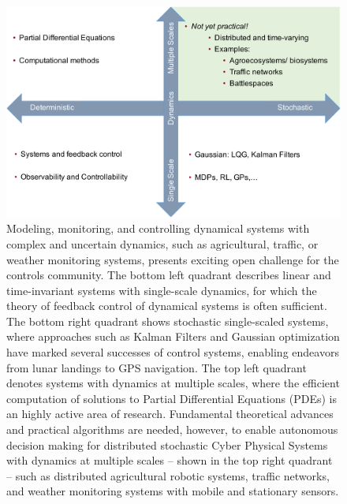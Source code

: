 \documentclass[letterpaper,12pt,peerreviewca,draftcls]{IEEEtran}
\begin{document}
\begin{figure}[h] %
	\centering
	\includegraphics[width=\columnwidth]{"Figure 2"}
		\caption{Modeling, monitoring, and controlling dynamical systems with complex and uncertain dynamics, such as agricultural, traffic, or weather monitoring systems, presents exciting open challenge for the controls community. The bottom left quadrant describes linear and time-invariant systems with single-scale dynamics, for which the theory of feedback control of dynamical systems is often sufficient. The bottom right quadrant shows stochastic single-scaled systems, where approaches such as Kalman Filters and Gaussian optimization have marked several successes of control systems, enabling endeavors from lunar landings to GPS navigation. The top left quadrant denotes systems with dynamics at multiple scales, where the efficient computation of solutions to Partial Differential Equations (PDEs) is an highly active area of research. Fundamental theoretical advances and practical algorithms are needed, however, to enable autonomous decision making for distributed stochastic Cyber Physical Systems with dynamics at multiple scales – shown in the top right quadrant – such as distributed agricultural robotic systems, traffic networks, and weather monitoring systems with mobile and stationary sensors.}
	\label{fig:cps_soa}
\end{figure}
\end{document}

